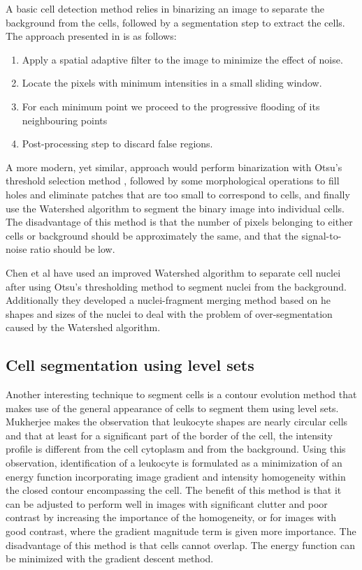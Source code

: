 \documentclass[12pt,a4paper,openany]{book}
\begin{document}
A basic cell detection method relies in binarizing an image to separate the background from the cells, followed by a segmentation step to extract the cells. The approach presented in \cite{chen99} is as follows:

\begin{enumerate}
  \item Apply a spatial adaptive filter to the image to minimize the effect of noise.
  \item Locate the pixels with minimum intensities in a small sliding window.
  \item For each minimum point we proceed to the progressive flooding of its neighbouring points
  \item Post-processing step to discard false regions.
\end{enumerate}

A more modern, yet similar, approach would perform binarization with Otsu's threshold selection method \cite{otsu79}, followed by some morphological operations \cite{serra83} to fill holes and eliminate patches that are too small to correspond to cells, and finally use the Watershed algorithm \cite{beucher79} to segment the binary image into individual cells. The disadvantage of this method is that the number of pixels belonging to either cells or background should be approximately the same, and that the signal-to-noise ratio should be low.

Chen et al \cite{chen06} have used an improved Watershed algorithm \cite{vincent93} to separate cell nuclei after using Otsu's thresholding method to segment nuclei from the background. Additionally they developed a nuclei-fragment merging method based on he shapes and sizes of the nuclei to deal with the problem of over-segmentation caused by the Watershed algorithm.


\subsection{Cell segmentation using level sets}

Another interesting technique to segment cells is a contour evolution method that makes use of the general appearance of cells to segment them using level sets. Mukherjee \cite{mukherjee04} makes the observation that leukocyte shapes are nearly circular cells and that at least for a significant part of the border of the cell, the intensity profile is different from the cell cytoplasm and from the background. Using this observation, identification of a leukocyte is formulated as a minimization of an energy function incorporating image gradient and intensity homogeneity within the closed contour encompassing the cell. The benefit of this method is that it can be adjusted to perform well in images with significant clutter and poor contrast by increasing the importance of the homogeneity, or for images with good contrast, where the gradient magnitude term is given more importance. The disadvantage of this method is that cells cannot overlap. The energy function can be minimized with the gradient descent method.
\end{document}

